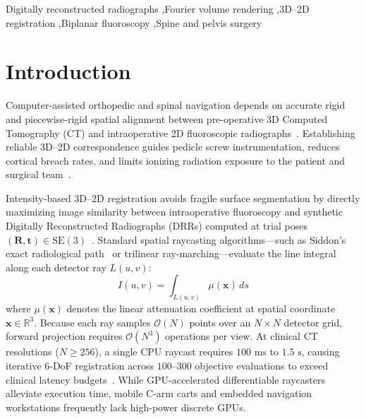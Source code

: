 \documentclass[review,12pt]{elsarticle}
\begin{document}
\begin{frontmatter}
\begin{abstract}
eliminates wide-field CT magnification drift ($100.0\% <2\text{ mm}$ standalone across all four clinical Spine and Abdominal CT cohorts: $0.307\text{--}1.406\text{ mm}$ median, and $91.7\% <2\text{ mm}$ on DeepFluoro), while pairing $K{=}4$ multi-survivor PoU-Triton with a $20$-step \texttt{f32} \texttt{nanodrr} polish after per-axis isocenter parity calibration achieves $\mathbf{0.835\text{ mm}}$ median mTRE ($\mathbf{100.0\% <2\text{ mm}}$ overall and on unanchored Tier~2) on DeepFluoro in $\mathbf{1.37\text{ s}}$ reg ($\mathbf{1.81\text{ s}}$ total) and only $\mathbf{464.1\text{ MB}}$ peak VRAM ($<0.5\text{ GB}$), alongside $0.046\text{--}0.642\text{ mm}$ median error on clinical Spine and Abdominal CT.
\end{abstract}

\begin{keyword}
Digitally reconstructed radiographs \sep Fourier volume rendering \sep 3D--2D registration \sep Biplanar fluoroscopy \sep Spine and pelvis surgery
\end{keyword}

\end{frontmatter}

\linenumbers

\section{Introduction}
Computer-assisted orthopedic and spinal navigation depends on accurate rigid and piecewise-rigid spatial alignment between pre-operative 3D Computed Tomography (CT) and intraoperative 2D fluoroscopic radiographs~\cite{markelj2012review,van2018evaluation}. Establishing reliable 3D--2D correspondence guides pedicle screw instrumentation, reduces cortical breach rates, and limits ionizing radiation exposure to the patient and surgical team~\cite{knez2020computer}.

Intensity-based 3D--2D registration avoids fragile surface segmentation by directly maximizing image similarity between intraoperative fluoroscopy and synthetic Digitally Reconstructed Radiographs (DRRs) computed at trial poses $(\mathbf{R}, \mathbf{t}) \in \mathrm{SE}(3)$~\cite{unberath2021impact}. Standard spatial raycasting algorithms---such as Siddon's exact radiological path~\cite{siddon1985fast} or trilinear ray-marching---evaluate the line integral along each detector ray $L(u,v)$:
\begin{equation}
I(u,v) = \int_{L(u,v)} \mu(\mathbf{x})\, ds
\end{equation}
where $\mu(\mathbf{x})$ denotes the linear attenuation coefficient at spatial coordinate $\mathbf{x} \in \mathbb{R}^3$. Because each ray samples $\mathcal{O}(N)$ points over an $N \times N$ detector grid, forward projection requires $\mathcal{O}(N^3)$ operations per view. At clinical CT resolutions ($N \ge 256$), a single CPU raycast requires $100\text{ ms}$ to $1.5\text{ s}$, causing iterative 6-DoF registration across $100$--$300$ objective evaluations to exceed clinical latency budgets~\cite{gopalakrishnan2022drr,killeen2023diffdrr}. While GPU-accelerated differentiable raycasters alleviate execution time, mobile C-arm carts and embedded navigation workstations frequently lack high-power discrete GPUs.
\end{document}
